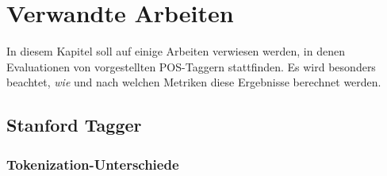 %
\chapter{Verwandte Arbeiten}
\label{sec:related}

In diesem Kapitel soll auf einige Arbeiten verwiesen werden, in denen Evaluationen von vorgestellten POS-Taggern stattfinden. Es wird besonders beachtet, \textit{wie} und nach welchen Metriken diese Ergebnisse berechnet werden.


\section{Stanford Tagger}
\label{sec:related:stanford}
\cite{Paper:StanfordTagger}


\subsection{Tokenization-Unterschiede}
\label{sec:general:goals:tok}




